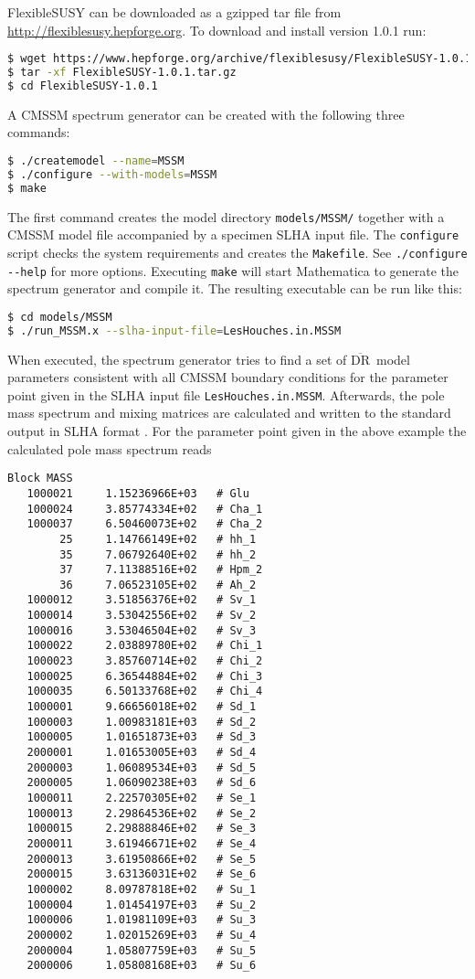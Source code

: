 \documentclass[final,3p,11pt,pdflatex]{elsarticle}
\makeatletter
\newcommand{\fs}{FlexibleSUSY\@\xspace}
\newcommand{\mathematica}{Mathematica\xspace}
\newcommand{\code}[1]{\lstinline|#1|}  %
\newcommand{\textoverline}[1]{$\overline{\mbox{#1}}$}
\newcommand{\DRbar}{\textoverline{DR}\xspace}
\makeatother
\begin{document}
\fs can be downloaded as a gzipped tar file from
\url{http://flexiblesusy.hepforge.org}.  To download and install
version 1.0.1 run:
%
\begin{lstlisting}[language=bash]
$ wget https://www.hepforge.org/archive/flexiblesusy/FlexibleSUSY-1.0.1.tar.gz
$ tar -xf FlexibleSUSY-1.0.1.tar.gz
$ cd FlexibleSUSY-1.0.1
\end{lstlisting}%
%
A CMSSM spectrum generator can be created with the following three
commands:
%
\begin{lstlisting}[language=bash]
$ ./createmodel --name=MSSM
$ ./configure --with-models=MSSM
$ make
\end{lstlisting}%
%
The first command creates the model directory \code{models/MSSM/}
together with a CMSSM model file accompanied by
a specimen SLHA input file.  The \code{configure} script checks
the system requirements and creates the \code{Makefile}.  See
\code{./configure --help} for more options.  Executing \code{make}
will start \mathematica to generate the spectrum generator and compile
it.  The resulting executable can be run like this:
%
\begin{lstlisting}[language=bash]
$ cd models/MSSM 
$ ./run_MSSM.x --slha-input-file=LesHouches.in.MSSM
\end{lstlisting}
%
When executed, the spectrum generator tries to find a set of \DRbar\
model parameters consistent with all CMSSM boundary conditions for the
parameter point given in the SLHA input file
\code{LesHouches.in.MSSM}.  Afterwards, the pole mass
spectrum and mixing matrices are calculated and written to the standard
output in SLHA format \cite{Skands:2003cj,Allanach:2008qq}.  For the
parameter point given in the above example the calculated pole mass
spectrum reads
%
\begin{lstlisting}
Block MASS
   1000021     1.15236966E+03   # Glu
   1000024     3.85774334E+02   # Cha_1
   1000037     6.50460073E+02   # Cha_2
        25     1.14766149E+02   # hh_1
        35     7.06792640E+02   # hh_2
        37     7.11388516E+02   # Hpm_2
        36     7.06523105E+02   # Ah_2
   1000012     3.51856376E+02   # Sv_1
   1000014     3.53042556E+02   # Sv_2
   1000016     3.53046504E+02   # Sv_3
   1000022     2.03889780E+02   # Chi_1
   1000023     3.85760714E+02   # Chi_2
   1000025     6.36544884E+02   # Chi_3
   1000035     6.50133768E+02   # Chi_4
   1000001     9.66656018E+02   # Sd_1
   1000003     1.00983181E+03   # Sd_2
   1000005     1.01651873E+03   # Sd_3
   2000001     1.01653005E+03   # Sd_4
   2000003     1.06089534E+03   # Sd_5
   2000005     1.06090238E+03   # Sd_6
   1000011     2.22570305E+02   # Se_1
   1000013     2.29864536E+02   # Se_2
   1000015     2.29888846E+02   # Se_3
   2000011     3.61946671E+02   # Se_4
   2000013     3.61950866E+02   # Se_5
   2000015     3.63136031E+02   # Se_6
   1000002     8.09787818E+02   # Su_1
   1000004     1.01454197E+03   # Su_2
   1000006     1.01981109E+03   # Su_3
   2000002     1.02015269E+03   # Su_4
   2000004     1.05807759E+03   # Su_5
   2000006     1.05808168E+03   # Su_6
\end{lstlisting}
\end{document}
